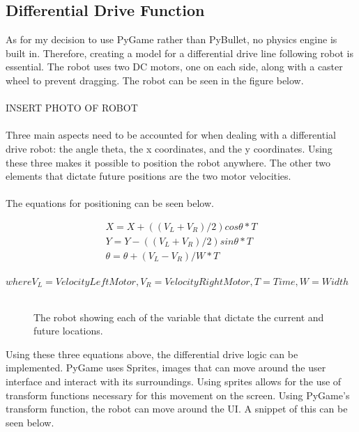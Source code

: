 \documentclass[a4paper,11pt]{article}
\begin{document}
\subsection{Differential Drive Function}
As for my decision to use PyGame rather than PyBullet, no physics engine is built in. Therefore, creating a model for a differential drive line following robot is essential. The robot uses two DC motors, one on each side, along with a caster wheel to prevent dragging. The robot can be seen in the figure below.
\\\\
INSERT PHOTO OF ROBOT
\\\\
Three main aspects need to be accounted for when dealing with a differential drive robot: the angle theta, the x coordinates, and the y coordinates. Using these three makes it possible to position the robot anywhere. The other two elements that dictate future positions are the two motor velocities.
\\\\
The equations for positioning can be seen below.


\begin{equation}
\begin{aligned}
X = X+((V_L+V_R)/2) cos\theta*T \\
Y=Y-((V_L+V_R)/2) sin\theta*T \\
\theta=\theta+(V_L-V_R)/W*T
\end{aligned}
\end{equation}\\
$where V_L=Velocity Left Motor,V_R=Velocity Right Motor,T=Time,W=Width$ \\\\
\begin{figure}[H]
\label{fig:}
\centering
\centering

\caption{The robot showing each of the variable that dictate the current and future locations.}
\end{figure}

Using these three equations above, the differential drive logic can be implemented. PyGame uses Sprites, images that can move around the user interface and interact with its surroundings. Using sprites allows for the use of transform functions necessary for this movement on the screen. Using PyGame's transform function, the robot can move around the UI. A snippet of this can be seen below.
\end{document}
